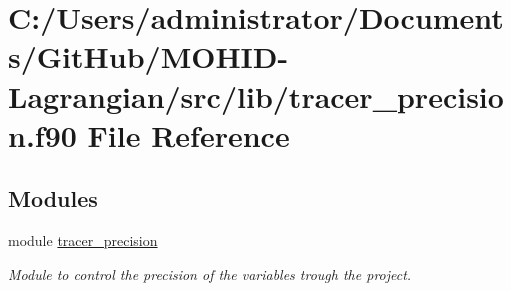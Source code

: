 \hypertarget{tracer__precision_8f90}{}\section{C\+:/\+Users/administrator/\+Documents/\+Git\+Hub/\+M\+O\+H\+I\+D-\/\+Lagrangian/src/lib/tracer\+\_\+precision.f90 File Reference}
\label{tracer__precision_8f90}
\subsection*{Modules}
\begin{DoxyCompactItemize}
\item 
module \mbox{\hyperlink{namespacetracer__precision}{tracer\+\_\+precision}}
\begin{DoxyCompactList}\small\item\em Module to control the precision of the variables trough the project. \end{DoxyCompactList}\end{DoxyCompactItemize}
